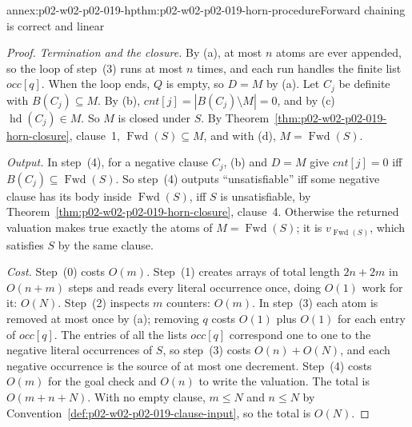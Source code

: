 \begin{annexitem}{annex:p02-w02-p02-019-hp}{thm:p02-w02-p02-019-horn-procedure}{Forward chaining is correct and linear}
\begin{proof}
\emph{Termination and the closure.}  By (a), at most \(n\) atoms are ever
appended, so the loop of step~(3) runs at most \(n\) times, and each run
handles the finite list \(\mathit{occ}[q]\).  When the loop ends, \(Q\) is
empty, so \(D=M\) by (a).  Let \(C_j\) be definite with
\(B(C_j)\subseteq M\).  By (b), \(\mathit{cnt}[j]=|B(C_j)\setminus M|=0\), and
by (c) \(\operatorname{hd}(C_j)\in M\).  So \(M\) is closed under \(S\).  By
Theorem~\ref{thm:p02-w02-p02-019-horn-closure}, clause~1,
\(\operatorname{Fwd}(S)\subseteq M\), and with (d),
\(M=\operatorname{Fwd}(S)\).

\emph{Output.}  In step~(4), for a negative clause \(C_j\), (b) and \(D=M\)
give \(\mathit{cnt}[j]=0\) iff \(B(C_j)\subseteq\operatorname{Fwd}(S)\).  So
step~(4) outputs ``unsatisfiable'' iff some negative clause has its body
inside \(\operatorname{Fwd}(S)\), iff \(S\) is unsatisfiable, by
Theorem~\ref{thm:p02-w02-p02-019-horn-closure}, clause~4.  Otherwise the
returned valuation makes true exactly the atoms of \(M=\operatorname{Fwd}(S)\);
it is \(v_{\operatorname{Fwd}(S)}\), which satisfies \(S\) by the same clause.

\emph{Cost.}  Step~(0) costs \(O(m)\).  Step~(1) creates arrays of total
length \(2n+2m\) in \(O(n+m)\) steps and reads every literal occurrence once,
doing \(O(1)\) work for it: \(O(N)\).  Step~(2) inspects \(m\) counters:
\(O(m)\).  In step~(3) each atom is removed at most once by (a); removing
\(q\) costs \(O(1)\) plus \(O(1)\) for each entry of \(\mathit{occ}[q]\).  The
entries of all the lists \(\mathit{occ}[q]\) correspond one to one to the
negative literal occurrences of \(S\), so step~(3) costs
\(O(n)+O(N)\), and each negative occurrence is the source of at most one
decrement.  Step~(4) costs \(O(m)\) for the goal check and \(O(n)\) to write
the valuation.  The total is \(O(m+n+N)\).  With no empty clause,
\(m\leq N\) and \(n\leq N\) by
Convention~\ref{def:p02-w02-p02-019-clause-input}, so the total is \(O(N)\).
\end{proof}
\end{annexitem}

